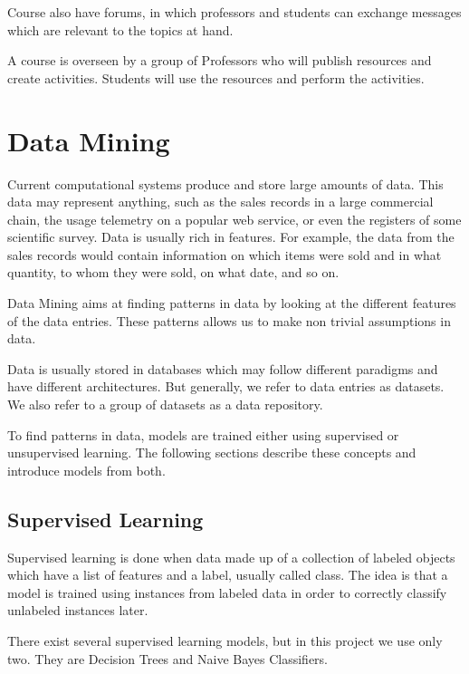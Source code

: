 Course also have forums, in which professors and students can exchange messages
which are relevant to the topics at hand.

A course is overseen by a group of Professors who will publish resources and
create activities. Students will use the resources and perform the
activities.~\cite{ind_014, ind_015}

\section{Data Mining}

Current computational systems produce and store large amounts of data. This
data may represent anything, such as the sales records in a large commercial
chain, the usage telemetry on a popular web service, or even the registers of
some scientific survey. Data is usually rich in features. For example, the data
from the sales records would contain information on which items were sold and
in what quantity, to whom they were sold, on what date, and so on.

Data Mining aims at finding patterns in data by looking at the different
features of the data entries. These patterns allows us to make non trivial
assumptions in data.~\cite{book_dm_practical}

Data is usually stored in databases which may follow different paradigms and
have different architectures. But generally, we refer to data entries as
datasets. We also refer to a group of datasets as a data repository.

To find patterns in data, models are trained either using supervised or
unsupervised learning. The following sections describe these concepts and
introduce models from both.

\subsection{Supervised Learning}

Supervised learning is done when data made up of a collection of labeled
objects which have a list of features and a label, usually called class. The
idea is that a model is trained using instances from labeled data in order to
correctly classify unlabeled instances later.

There exist several supervised learning models, but in this project we use only
two. They are Decision Trees and Naive Bayes
Classifiers.~\cite{book_ml,book_dm_practical}

